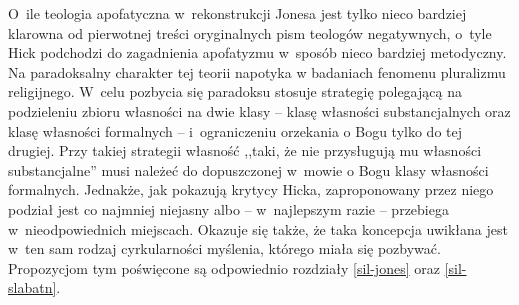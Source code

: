 O~ile teologia apofatyczna w~rekonstrukcji Jonesa jest tylko nieco bardziej klarowna od pierwotnej treści oryginalnych pism teologów negatywnych, o~tyle Hick podchodzi do zagadnienia apofatyzmu w~sposób nieco bardziej metodyczny.
Na paradoksalny charakter tej teorii napotyka w badaniach fenomenu pluralizmu religijnego. W~celu pozbycia się paradoksu stosuje strategię polegającą na podzieleniu zbioru własności na dwie klasy -- klasę własności substancjalnych oraz klasę własności formalnych --  i~ograniczeniu orzekania o Bogu tylko do tej drugiej. Przy takiej strategii własność ,,taki, że nie przysługują mu własności substancjalne'' musi należeć do  dopuszczonej w~mowie o Bogu klasy własności formalnych. Jednakże, jak pokazują krytycy Hicka, zaproponowany przez niego podział jest co najmniej niejasny albo -- w~najlepszym razie -- przebiega w~nieodpowiednich miejscach. Okazuje się także, że taka koncepcja uwikłana jest w~ten sam rodzaj cyrkularności myślenia, którego miała się pozbywać.
Propozycjom tym poświęcone są odpowiednio rozdziały \ref{sil-jones} oraz \ref{sil-slabatn}.

